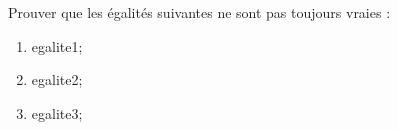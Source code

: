 \documentclass[exercice]{thedocument}%
\begin{document}
%
\smallskip\par\noindent Prouver que les égalités suivantes ne sont pas
toujours vraies :
\begin{enumerate}
    \item \<egalite1;
    \item \<egalite2;
    \item \<egalite3;
\end{enumerate}
\end{document}
